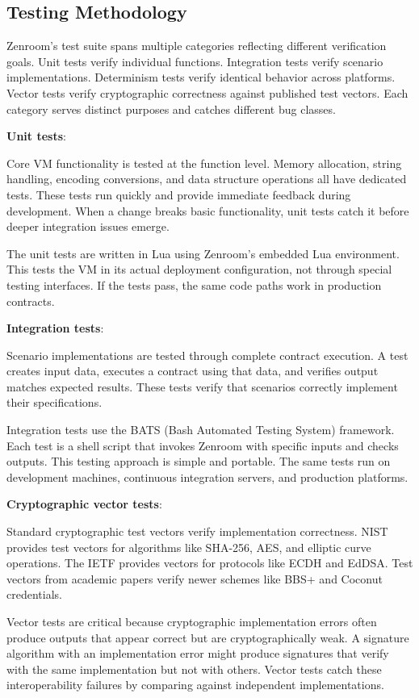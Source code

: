 \subsection{Testing Methodology}

Zenroom's test suite spans multiple categories reflecting different
verification goals. Unit tests verify individual
functions. Integration tests verify scenario
implementations. Determinism tests verify identical behavior across
platforms. Vector tests verify cryptographic correctness against
published test vectors. Each category serves distinct purposes and
catches different bug classes.

\textbf{Unit tests}:

Core VM functionality is tested at the function level. Memory
allocation, string handling, encoding conversions, and data structure
operations all have dedicated tests. These tests run quickly and
provide immediate feedback during development. When a change breaks
basic functionality, unit tests catch it before deeper integration
issues emerge.

The unit tests are written in Lua using Zenroom's embedded Lua
environment. This tests the VM in its actual deployment configuration,
not through special testing interfaces. If the tests pass, the same
code paths work in production contracts.

\textbf{Integration tests}:

Scenario implementations are tested through complete contract
execution. A test creates input data, executes a contract using that
data, and verifies output matches expected results. These tests verify
that scenarios correctly implement their specifications.

Integration tests use the BATS (Bash Automated Testing System)
framework. Each test is a shell script that invokes Zenroom with
specific inputs and checks outputs. This testing approach is simple
and portable. The same tests run on development machines, continuous
integration servers, and production platforms.

\textbf{Cryptographic vector tests}:

Standard cryptographic test vectors verify implementation
correctness. NIST provides test vectors for algorithms like SHA-256,
AES, and elliptic curve operations. The IETF provides vectors for
protocols like ECDH and EdDSA. Test vectors from academic papers
verify newer schemes like BBS+ and Coconut credentials.

Vector tests are critical because cryptographic implementation errors
often produce outputs that appear correct but are cryptographically
weak. A signature algorithm with an implementation error might produce
signatures that verify with the same implementation but not with
others. Vector tests catch these interoperability failures by
comparing against independent implementations.

